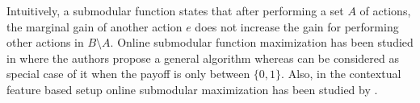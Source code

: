 Intuitively, a submodular function states that after performing a set $A$ of actions, the marginal gain of another action $e$ does not increase the gain for performing other actions in $B \setminus A$. Online submodular function maximization has been studied in \citet{streeter2009online} where the authors propose a general algorithm whereas  \citet{radlinski2008learning} can be considered as special case of it when the payoff is only between $\lbrace 0, 1\rbrace$. Also, in the contextual feature based setup online  submodular maximization has been studied by  \citet{yue2011linear}.



